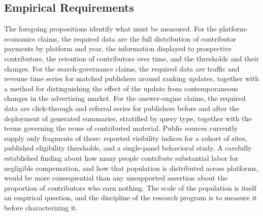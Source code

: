 \documentclass[11pt]{article}
\theoremstyle{remark}
\begin{document}
\subsection{Empirical Requirements}

The foregoing propositions identify what must be measured. For the platform-economics claims, the required data are the full distribution of contributor payments by platform and year, the information displayed to prospective contributors, the retention of contributors over time, and the thresholds and their changes. For the search-governance claims, the required data are traffic and revenue time series for matched publishers around ranking updates, together with a method for distinguishing the effect of the update from contemporaneous changes in the advertising market. For the answer-engine claims, the required data are click-through and referral series for publishers before and after the deployment of generated summaries, stratified by query type, together with the terms governing the reuse of contributed material. Public sources currently supply only fragments of these: reported visibility indices for a cohort of sites, published eligibility thresholds, and a single-panel behavioral study. A carefully established finding about how many people contribute substantial labor for negligible compensation, and how that population is distributed across platforms, would be more consequential than any unsupported assertion about the proportion of contributors who earn nothing. The scale of the population is itself an empirical question, and the discipline of the research program is to measure it before characterizing it.
\end{document}
